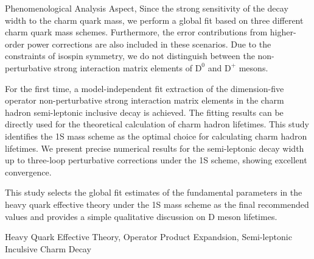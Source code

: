 \documentclass{LZUThesis-PgD&PhD}
\newcommand{\mrm}[1]{\mathrm{#1}}
\begin{document}
{Phenomenological Analysis Aspect, Since the strong sensitivity of the decay width to the charm quark mass, we perform a global fit based on three different charm quark mass schemes. Furthermore, the error contributions from higher-order power corrections are also included in these scenarios. Due to the constraints of isospin symmetry, we do not distinguish between the non-perturbative strong interaction matrix elements of \( \mathrm{D}^0 \) and \( \mathrm{D}^+ \) mesons.

For the first time, a model-independent fit extraction of the dimension-five operator non-perturbative strong interaction matrix elements in the charm hadron semi-leptonic inclusive decay is achieved. The fitting results can be directly used for the theoretical calculation of charm hadron lifetimes. This study identifies the 1S mass scheme as the optimal choice for calculating charm hadron lifetimes. We present precise numerical results for the semi-leptonic decay width up to three-loop perturbative corrections under the 1S scheme, showing excellent convergence.

This study selects the global fit estimates of the fundamental parameters in the heavy quark effective theory under the 1S mass scheme as the final recommended values and provides a simple qualitative discussion on \( \mrm{D} \) meson lifetimes.
}{Heavy Quark Effective Theory, Operator Product Expandsion, Semi-leptonic Inculsive Charm Decay}

\customcontent


\mainmatter









\begin{appendix}
    
    
    
    \end{appendix}
\end{document}
